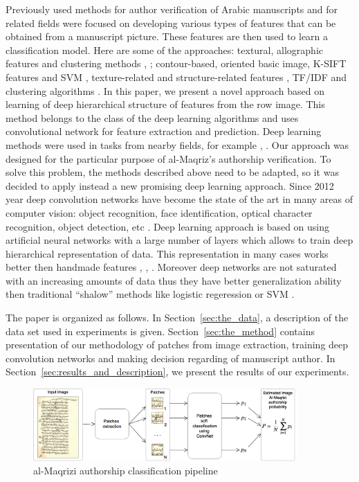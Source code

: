 \documentclass[conference]{IEEEtran}
\begin{document}
Previously used methods for author verification of Arabic manuscripts and for related fields were focused on developing various types of features that can be obtained from a manuscript picture. These features are then used to learn a classification model. Here are some of the approaches: textural, allographic features and clustering methods \cite{MBulacu}, \cite{MBulacu1}; contour-based, oriented basic image, K-SIFT features and SVM \cite{DFecker}, texture-related and structure-related features \cite{Salvador}, TF/IDF and clustering algorithms \cite{Dunn}. In this paper, we present a novel approach based on learning of deep hierarchical structure of features from the row image. This method belongs to the class of the deep learning algorithms \cite{DL} and uses convolutional network \cite{CNN} for feature extraction and prediction. Deep learning methods were used in tasks from nearby fields, for example \cite{DL_Arabic_1}, \cite{DL_Arabic_2}. Our approach was designed for the particular purpose of al-Maqriz's authorship verification. To solve this problem, the methods described above need to be adapted, so it was decided to apply instead a new promising deep learning approach. Since 2012 year deep convolution networks \cite{Alexnet} have become the state of the art in many areas of computer vision: object recognition, face identification, optical character recognition, object detection, etc \cite{DL}. Deep learning approach is based on using artificial neural networks with a large number of layers which allows to train deep hierarchical representation of data. This representation in many cases works better then handmade features \cite{DL}, \cite{Alexnet}, \cite{Googlenet}. Moreover deep networks are not saturated with an increasing amounts of data thus they have better generalization ability then traditional ``shalow'' methods like logistic regeression or SVM \cite{DL}.   

The paper is organized as follows. In Section~\ref{sec:the_data}, a description of the data set used in experiments is given. Section~\ref{sec:the_method} contains presentation of our methodology of patches from image extraction, training deep convolution networks and making decision regarding of manuscript author. In Section~\ref{sec:results_and_description}, we present the results of our experiments.
	

\begin{figure}[!t]
	\center
  \includegraphics[width=0.9\textwidth]{figures/Al-Maqrizi_classification_pipeline.png}
  \caption{al-Maqrizi authorship classification pipeline}
  \label{fig:pipeline}
\end{figure}	
	
\end{document}
